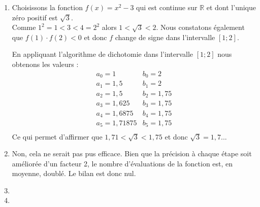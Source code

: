 \begin{center}
\end{center}

\everymath{\displaystyle}


\begin{enumerate}[label=R4.\arabic*, font=\bfseries, itemsep=8mm,labelsep*=4mm]
\item
Choisissons la fonction $f(x)=x^2-3$ qui est continue sur $\mathbb{R}$ et dont l'unique zéro positif est $\sqrt{3}$.\\
Comme $1^2=1<3<4=2^2$ alors $1<\sqrt{3}<2$. Nous constatons également que $f(1)\cdot f(2)<0$ et donc $f$ change de signe dans l'intervalle $[1;2]$.

En appliquant l'algorithme de dichotomie dans l'intervalle $[1;2]$ nous obtenons les valeurs :
$$
\begin{array}{ll}
  a_0 = 1			& b_0 = 2 \\
  a_1 = 1,5			& b_1 = 2 \\
  a_2 = 1,5		& b_2 = 1,75 \\
  a_3 = 1,625		& b_3 = 1,75 \\
  a_4 = 1,6875		& b_4 = 1,75 \\
  a_5 = 1,71875		& b_5 = 1,75 \\
\end{array}
$$
Ce qui permet d'affirmer que $1,71<\sqrt{3}<1,75$ et donc $\sqrt{3}= 1,7...$






\item
Non, cela ne serait pas pus efficace. Bien que la précision à chaque étape soit améliorée d'un facteur 2, le nombre d'évaluations de la fonction est, en moyenne, doublé. Le bilan est donc nul.







\item
{}




\item
{}








\end{enumerate}
